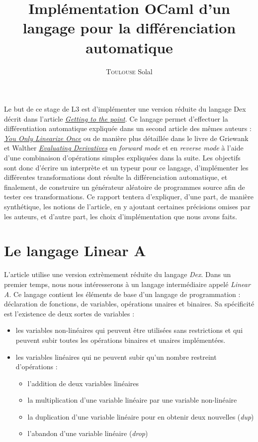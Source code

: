 \documentclass[a4paper, french, 11pt]{article}
\date{}
\title{Implémentation OCaml d'un langage pour la différenciation automatique}
\author{
  \textsc{Toulouse} Solal \\
}
\begin{document}
\maketitle





Le but de ce stage de L3 est d'implémenter une version réduite du langage Dex décrit dans l'article \href{https://arxiv.org/abs/2104.05372}{\textit{Getting to the point}}. Ce langage permet d'effectuer la différentiation automatique expliquée dans un second article des mêmes auteurs : \href{https://arxiv.org/abs/2204.10923?context=cs}{\textit{You Only Linearize Once}} ou de manière plus détaillée dans le livre de Griewank et Walther \href{https://epubs.siam.org/doi/book/10.1137/1.9780898717761}{\textit{Evaluating Derivatives}} en \textit{forward mode} et en \textit{reverse mode} à l'aide d'une combinaison d'opérations simples expliquées dans la suite. Les objectifs sont donc d'écrire un interprète et un typeur pour ce langage, d'implémenter les différentes transformations dont résulte la différenciation automatique, et finalement, de construire un générateur aléatoire de programmes source afin de tester ces transformations. Ce rapport tentera d'expliquer, d'une part, de manière synthétique, les notions de l'article, en y ajoutant certaines précisions omises par les auteurs, et d'autre part, les choix d'implémentation que nous avons faits.




\tableofcontents
\section{Le langage Linear A}

L'article utilise une version extrèmement réduite du langage \textit{Dex}. Dans un premier temps, nous nous intéresserons à un langage intermédiaire appelé \textit{Linear A}. Ce langage contient les éléments de base d'un langage de programmation : déclaration de fonctions, de variables, opérations unaires et binaires. Sa spécificité est l'existence de deux sortes de variables :
\begin{itemize}[label=\textbullet, font=\LARGE]
  \item les variables non-linéaires qui peuvent être utilisées sans restrictions et qui peuvent subir toutes les opérations binaires et unaires implémentées.
  \item les variables linéaires qui ne peuvent subir qu'un nombre restreint d'opérations :
      \begin{itemize}
        \item l'addition de deux variables linéaires
        \item la multiplication d'une variable linéaire par une variable non-linéaire
        \item la duplication d'une variable linéaire pour en obtenir deux nouvelles (\textit{dup})
        \item l'abandon d'une variable linéaire (\textit{drop})
      \end{itemize}
\end{itemize}
\end{document}
